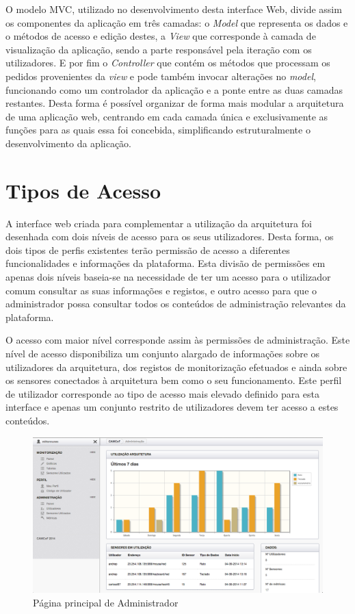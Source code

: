 O modelo MVC, utilizado no desenvolvimento desta interface Web, divide assim os componentes da aplicação em três camadas: o \textit{Model} que representa os dados e o métodos de acesso e edição destes, a \textit{View} que corresponde à camada de visualização da aplicação, sendo a parte responsável pela iteração com os utilizadores. E por fim o \textit{Controller} que contém os métodos que processam os pedidos provenientes da \textit{view} e pode também invocar alterações no \textit{model}, funcionando como um controlador da aplicação e a ponte entre as duas camadas restantes. Desta forma é possível organizar de forma mais modular a arquitetura de uma aplicação web, centrando em cada camada única e exclusivamente as funções para as quais essa foi concebida, simplificando estruturalmente o desenvolvimento da aplicação.

\section{Tipos de Acesso}

A interface web criada para complementar a utilização da arquitetura foi desenhada com dois níveis de acesso para os seus utilizadores. Desta forma, os dois tipos de perfis existentes terão permissão de acesso a diferentes funcionalidades e informações da plataforma. Esta divisão de permissões em apenas dois níveis baseia-se na necessidade de ter um acesso para o utilizador comum consultar as suas informações e registos, e outro acesso para que o administrador possa consultar todos os conteúdos de administração relevantes da plataforma.

O acesso com maior nível corresponde assim às permissões de administração. Este nível de acesso disponibiliza um conjunto alargado de informações sobre os utilizadores da arquitetura, dos registos de monitorização efetuados e ainda sobre os sensores conectados à arquitetura bem como o seu funcionamento. Este perfil de utilizador corresponde ao tipo de acesso mais elevado definido para esta interface e apenas um conjunto restrito de utilizadores devem ter acesso a estes conteúdos.

 \begin{figure}[htb]
   \centering
   \includegraphics[scale=0.29]{Images/panel.png}
   \caption{Página principal de Administrador}
\end{figure}

